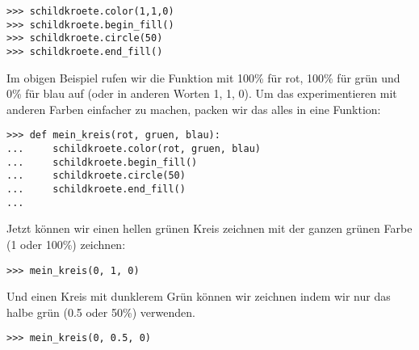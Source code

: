 \begin{Verbatim}[frame=single]
>>> schildkroete.color(1,1,0)
>>> schildkroete.begin_fill()
>>> schildkroete.circle(50)
>>> schildkroete.end_fill()
\end{Verbatim}

Im obigen Beispiel rufen wir die  Funktion mit 100\% für rot, 100\% für grün und 0\% für blau auf (oder in anderen Worten 1, 1, 0). Um das experimentieren mit anderen Farben einfacher zu machen, packen wir das alles in eine Funktion:

\begin{Verbatim}[frame=single]
>>> def mein_kreis(rot, gruen, blau):
...     schildkroete.color(rot, gruen, blau)
...     schildkroete.begin_fill()
...     schildkroete.circle(50)
...     schildkroete.end_fill()
...
\end{Verbatim}

\noindent
Jetzt können wir einen hellen grünen Kreis zeichnen mit der ganzen grünen Farbe (1 oder 100\%) zeichnen:

\begin{Verbatim}[frame=single]
>>> mein_kreis(0, 1, 0)
\end{Verbatim}

\noindent
Und einen Kreis mit dunklerem Grün können wir zeichnen indem wir nur das halbe grün (0.5 oder 50\%) verwenden.

\begin{Verbatim}[frame=single]
>>> mein_kreis(0, 0.5, 0)
\end{Verbatim}

